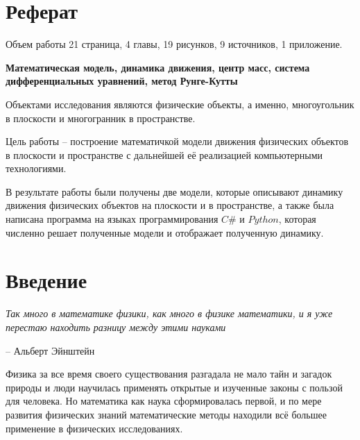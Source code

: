 \documentclass[12pt, a4paper]{extarticle}
\numberwithin{equation}{section}
\begin{document}
\justify 
\setlength{\parindent}{1.25cm} 
\newpage 
\thispagestyle{empty} 
\setcounter{page}{2} 
\section*{Реферат}
\vspace{\baselineskip}	
Объем работы 21 страница, 4 главы, 19 рисунков, 9 источников, 1 приложение.

\textbf{Математическая модель, динамика движения, центр масс, система дифференциальных уравнений, метод Рунге-Кутты}

Объектами исследования являются физические объекты, а именно, многоугольник в плоскости и многогранник в пространстве.

Цель работы – построение математичкой модели движения физических объектов в плоскости и пространстве с дальнейшей её реализацией компьютерными технологиями.                                          

В результате работы были получены две модели, которые описывают динамику движения физических объектов на плоскости и в пространстве, а также была написана программа на языках программирования $C\#$ и $Python$, которая численно решает полученные модели и отображает полученную динамику.

\newpage

\setcounter{page}{2}

\tableofcontents 
\newpage 

\section*{Введение}
\epigraph{\textit{Так много в математике физики, как много в физике математики, и я уже перестаю находить разницу между этими науками}}
{-- Альберт Эйнштейн}

Физика за все время своего существования разгадала не мало тайн и загадок природы и люди научилась применять открытые и изученные законы с пользой для человека. Но математика как наука сформировалась первой, и по мере развития физических знаний математические методы находили всё большее применение в физических исследованиях. 
\end{document}
